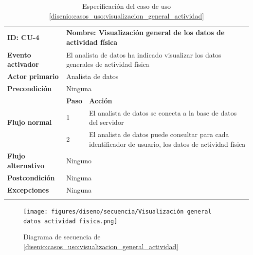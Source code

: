            \begin{table}[h]
                \centering
                \begin{tabularx}{\textwidth}{|l|l|X|}
                    \hline
                    \textbf{ID:} CU-4 & \multicolumn{2}{|X|}{\textbf{Nombre}: Visualización general de los datos de actividad física} \\
                    \hline
                    \textbf{Evento activador} & \multicolumn{2}{|X|}{El analista de datos ha indicado visualizar los datos generales de actividad física} \\
                    \hline
                    \textbf{Actor primario} & \multicolumn{2}{|X|}{Analista de datos} \\
                    \hline
                    \textbf{Precondición} & \multicolumn{2}{|X|}{Ninguna} \\
                    \hline
                    \multirow{3}{*}{\textbf{Flujo normal}} & \textbf{Paso} & \textbf{Acción} \\
                    \cline{2-3} & 1 & El analista de datos se conecta a la base de datos del servidor \\
                    \cline{2-3} & 2 & El analista de datos puede consultar para cada identificador de usuario, los datos de actividad física \\
                    \hline
                    \textbf{Flujo alternativo} & \multicolumn{2}{|X|}{Ninguno} \\
                    \hline
                    \textbf{Postcondición} & \multicolumn{2}{|X|}{Ninguna} \\
                    \hline
                    \textbf{Excepciones} & \multicolumn{2}{|X|}{Ninguna} \\
                    \hline
                    \caption{Especificación del caso de uso \ref{disenio:casos_uso:visualizacion_general_actividad}}
                    \label{tabla:casos_uso:visualizacion_general_actividad}
                \end{tabularx}
            \end{table}
    
            \begin{figure}[h]
                \centering
                \texttt{[image: figures/diseno/secuencia/Visualización general datos actividad fisica.png]}
                \caption{Diagrama de secuencia de \ref{disenio:casos_uso:visualizacion_general_actividad}}
                \label{figure:diagrama_secuencia:visualizacion_general_actividad}
            \end{figure}

